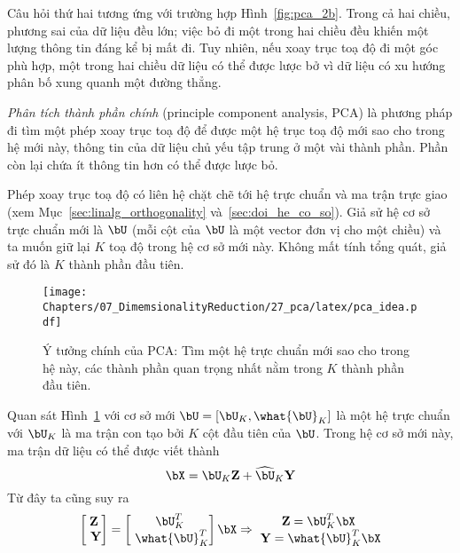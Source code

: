 Câu hỏi thứ hai tương ứng với trường hợp Hình~\ref{fig:pca_2b}. Trong cả hai
chiều, phương sai của dữ liệu đều lớn; việc bỏ đi một trong hai chiều đều khiến
một lượng thông tin đáng kể bị mất đi. Tuy nhiên, nếu xoay trục toạ độ đi một
góc phù hợp, một trong hai chiều dữ liệu có thể được lược bở vì dữ liệu có xu
hướng phân bố xung quanh một đường thẳng.
 
\textit{Phân tích thành phần chính} (principle component analysis, PCA) là
phương pháp đi tìm một phép xoay trục toạ độ để được một hệ trục toạ độ mới sao
cho trong hệ mới này, thông tin của dữ liệu chủ yếu tập trung ở một vài thành
phần. Phần còn lại chứa ít thông tin hơn có thể được lược bỏ.

Phép xoay trục toạ độ có liên hệ chặt chẽ tới hệ trực chuẩn và ma trận trực giao
(xem Mục~\ref{sec:linalg_orthogonality} và~\ref{sec:doi_he_co_so}). Giả sử hệ cơ
sở trực chuẩn mới là $\bU$ (mỗi cột của $\bU$ là một vector đơn vị cho
một chiều) và ta muốn giữ lại $K$ toạ độ trong hệ
cơ sở mới này. Không mất tính tổng quát, giả sử đó là $K$ thành phần đầu tiên.
\begin{figure}[t]
\centering
    \texttt{[image: Chapters/07\_DimemsionalityReduction/27\_pca/latex/pca\_idea.pdf]}
    \caption[]{Ý tưởng chính của PCA: Tìm một hệ trực chuẩn mới sao cho trong hệ này, các thành phần quan trọng nhất nằm trong $K$ thành phần đầu tiên.}
    \label{fig:27_3}
\end{figure}
Quan sát Hình~\ref{fig:27_3} với cơ sở mới $\bU =
[\bU_K, \what{\bU}_K]$ là một hệ trực chuẩn với $\bU_K$ là ma trận con tạo bởi $K$ cột đầu tiên của $\bU$. Trong hệ cơ sở mới này, ma trận dữ liệu có thể được viết thành
\begin{equation} 
\label{eqn:27_8}
    \bX = \bU_K \mathbf{Z} + \widehat{\bU}_K \mathbf{Y}
\end{equation} 
Từ đây ta cũng suy ra
\begin{eqnarray} 
\label{eqn:27_9}
    \left[\begin{matrix} \mathbf{Z} \\\ \mathbf{Y} \end{matrix} \right] =  
    \left[\begin{matrix} \bU_K^T \\\ \what{\bU}_K^T \end{matrix} \right]\bX \Rightarrow 
    \begin{matrix} 
    \mathbf{Z} = \bU_K^T \bX \\\ 
    \mathbf{Y} = \what{\bU}_K^T\bX 
    \end{matrix} 
\end{eqnarray}
